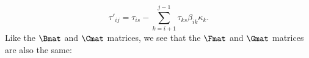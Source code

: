 \begin{equation}
\tau'_{i j }  = \tau_{i s} - \sum\limits_{k = i + 1}^{j - 1} \tau_{k s} \beta_{i k} \kappa_k.
\end{equation}
Like the $\Bmat$ and $\Cmat$ matrices, we see that the $\Fmat$ and $\Gmat$ matrices are also the same: